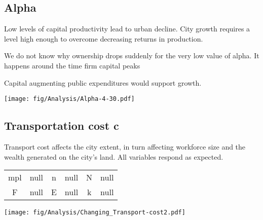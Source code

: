 \documentclass{article}
\begin{document}
\newpage



\newpage %

\subsection{Alpha}
Low levels of capital productivity lead to urban decline. City growth requires a level high enough to overcome decreasing returns in production. 

We do not know why ownership drops suddenly for the very low value of alpha. It happens around the time firm capital peaks

Capital augmenting public expenditures would support growth.
 

 \hspace*{-2.5cm}\texttt{[image: fig/Analysis/Alpha-4-30.pdf]}

\newpage %

\subsection{Transportation cost c}
Transport cost affects the city extent, in turn affecting workforce size and the wealth generated on the city's land. All variables respond as expected. 
 
\begin{tabular}{|c|c||c|c||c|c|}
mpl  & null   & n   & null & N   &  null \\
F    & null   & E   &  null  &  k & null
\end{tabular} 

 \hspace{-2.5cm}\texttt{[image: fig/Analysis/Changing\_Transport-cost2.pdf]}
\end{document}
